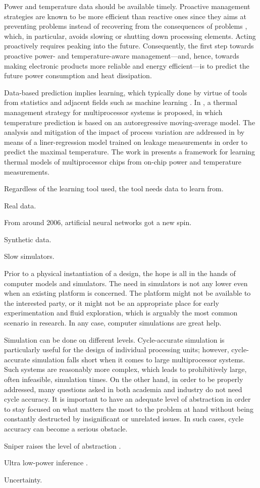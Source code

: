 Power and temperature data should be available timely. Proactive management
strategies are known to be more efficient than reactive ones since they aims at
preventing problems instead of recovering from the consequences of problems
\cite{coskun2008, beneventi2014}, which, in particular, avoids slowing or
shutting down processing elements. Acting proactively requires peaking into the
future. Consequently, the first step towards proactive power- and
temperature-aware management---and, hence, towards making electronic products
more reliable and energy efficient---is to predict the future power consumption
and heat dissipation.

Data-based prediction implies learning, which typically done by virtue of tools
from statistics and adjacent fields such as machine learning \cite{bishop2006}.
In \cite{coskun2008}, a thermal management strategy for multiprocessor systems
is proposed, in which temperature prediction is based on an autoregressive
moving-average model. The analysis and mitigation of the impact of process
variation are addressed in \cite{juan2014} by means of a liner-regression model
trained on leakage measurements in order to predict the maximal temperature. The
work in \cite{beneventi2014} presents a framework for learning thermal models of
multiprocessor chips from on-chip power and temperature measurements.

Regardless of the learning tool used, the tool needs data to learn from.

Real data.

From around 2006, artificial neural networks got a new spin.

Synthetic data.

Slow simulators.

Prior to a physical instantiation of a design, the hope is all in the hands of
computer models and simulators. The need in simulators is not any lower even
when an existing platform is concerned. The platform might not be available to
the interested party, or it might not be an appropriate place for early
experimentation and fluid exploration, which is arguably the most common
scenario in research. In any case, computer simulations are great help.

Simulation can be done on different levels. Cycle-accurate simulation is
particularly useful for the design of individual processing units; however,
cycle-accurate simulation falls short when it comes to large multiprocessor
systems. Such systems are reasonably more complex, which leads to prohibitively
large, often infeasible, simulation times. On the other hand, in order to be
properly addressed, many questions asked in both academia and industry do not
need cycle accuracy. It is important to have an adequate level of abstraction in
order to stay focused on what matters the most to the problem at hand without
being constantly destructed by insignificant or unrelated issues. In such cases,
cycle accuracy can become a serious obstacle.

Sniper raises the level of abstraction \cite{carlson2011}.

Ultra low-power inference \cite{park2015}.

Uncertainty.
